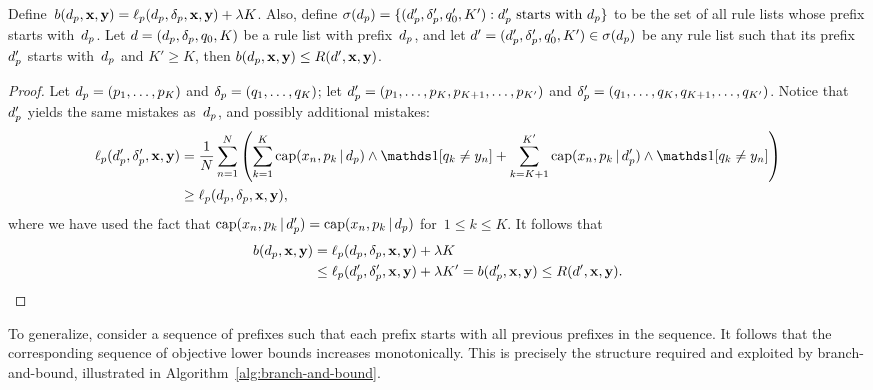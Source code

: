 \begin{theorem}
Define~${b(d_p, \mathbf{x}, \mathbf{y}) = \ell_p(d_p, \delta_p, \mathbf{x}, \mathbf{y}) + {\lambda} K}$.
%
Also, define
${\sigma(d_p) = \{(d_p', \delta_p', q_0', K') : d_p' \textnormal{ starts with } d_p \}}$
to be the set of all rule lists whose prefix starts with~$d_p$.
%
Let ${{d} = (d_p, \delta_p, q_0, K)}$ be a rule list
with prefix~$d_p$, and let
${{d}' = (d_p', \delta_p', q_0', K') \in \sigma(d_p)}$
be any rule list such that its prefix~$d_p'$ starts with~$d_p$
and ${K' \ge K}$, then ${b(d_p, \mathbf{x}, \mathbf{y}) \le R({d}', \mathbf{x}, \mathbf{y})}$.
\label{thm:bound}
\end{theorem}

\begin{proof}
Let ${d_p = (p_1, \dots, p_K)}$ and ${\delta_p = (q_1, \dots, q_K)}$;
let ${d_p' = (p_1, \dots, p_K, p_{K+1}, \dots, p_{K'})}$
and ${\delta_p' = (q_1, \dots, q_K, q_{K+1}, \dots, q_{K'})}$.
%
Notice that~$d_p'$ yields the same mistakes as~$d_p$,
and possibly additional mistakes:
\begin{align}
\Loss_p(\Prefix', \Labels', \x, \y)
&= \frac{1}{N} \sum_{n=1}^N \left( \sum_{k=1}^K \Cap(x_n, p_k \given \Prefix) \wedge \one [ q_k \neq y_n ]
+ \sum_{k=K+1}^{K'} \Cap(x_n, p_k \given \Prefix') \wedge \one [ q_k \neq y_n ] \right) \nn \\
&\ge \Loss_p(\Prefix, \Labels, \x, \y),
\label{eq:prefix-loss}
\end{align}
where we have used the fact that
${\textnormal{cap}(x_n, p_k \,|\, d_p') = \textnormal{cap}(x_n, p_k \,|\, d_p)}$
for~${1 \le k \le K}$.
%
It follows that
\begin{align}
b(\Prefix, \x, \y) &= \Loss_p(\Prefix, \Labels, \x, \y) + \Reg K \nn \\
&\le  \Loss_p(\Prefix', \Labels', \x, \y) + \Reg K' = b(\Prefix', \x, \y)
\le \Obj(\RL', \x, \y).
\label{eq:prefix-lb}
\end{align}
\end{proof}

To generalize, consider a sequence of prefixes such that each prefix
starts with all previous prefixes in the sequence.
%
It follows that the corresponding sequence of objective lower bounds
increases monotonically.
%
This is precisely the structure required and exploited by branch-and-bound,
illustrated in Algorithm~\ref{alg:branch-and-bound}.

